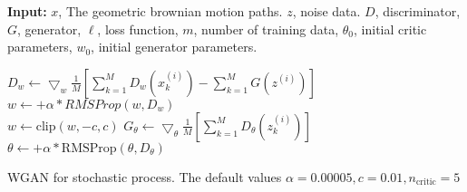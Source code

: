 \documentclass{article}
\begin{document}
\begin{algorithm}
	\textbf{Input:} $x$, The geometric brownian motion paths. $z$, noise data. $D$, discriminator, $G$, generator, $\ell$, loss function, $m$, number of training data, $\theta_0$, initial critic parameters, $w_0$, initial generator parameters.
	
  {
  	
  	{
    	{
    		$D_w \leftarrow \bigtriangledown_{w}\frac{1}{M}[\sum_{k=1}^{M}D_{w}(x_{k}^{(i)})-\sum_{k=1}^{M}G(z^{(i)})]$ \\
    		$w \leftarrow + \alpha*RMSProp(w,D_w)$ \\
    		$w \leftarrow \text{clip}(w,-c,c)$
    	}
    	$G_\theta \leftarrow \bigtriangledown_{\theta}\frac{1}{M}[\sum_{k=1}^{M}D_{\theta}(z_{k}^{(i)})]$
    	$\theta \leftarrow + \alpha*\text{RMSProp}(\theta,D_\theta)$ 
    }
  }
  \caption{WGAN for stochastic process. The default values $\alpha = 0.00005, c=0.01, n_{\text{critic}}=5$}
\end{algorithm}
\end{document}
